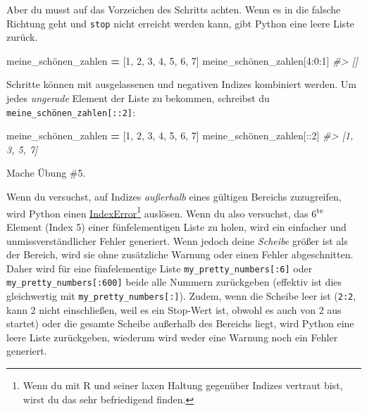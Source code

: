 \documentclass[
]{book}
\newenvironment{Shaded}{\begin{snugshade}}{\end{snugshade}}
\newcommand{\CommentTok}[1]{\textcolor[rgb]{0.56,0.35,0.01}{\textit{#1}}}
\newcommand{\DecValTok}[1]{\textcolor[rgb]{0.00,0.00,0.81}{#1}}
\newcommand{\NormalTok}[1]{#1}
\newcommand{\OperatorTok}[1]{\textcolor[rgb]{0.81,0.36,0.00}{\textbf{#1}}}
\begin{document}
Aber du musst auf das Vorzeichen des Schritts achten. Wenn es in die falsche Richtung geht und \texttt{stop} nicht erreicht werden kann, gibt Python eine leere Liste zurück.

\begin{Shaded}
\begin{Highlighting}[]
\NormalTok{meine\_schönen\_zahlen }\OperatorTok{=}\NormalTok{ [}\DecValTok{1}\NormalTok{, }\DecValTok{2}\NormalTok{, }\DecValTok{3}\NormalTok{, }\DecValTok{4}\NormalTok{, }\DecValTok{5}\NormalTok{, }\DecValTok{6}\NormalTok{, }\DecValTok{7}\NormalTok{]}
\NormalTok{meine\_schönen\_zahlen[}\DecValTok{4}\NormalTok{:}\DecValTok{0}\NormalTok{:}\DecValTok{1}\NormalTok{]}
\CommentTok{\#\textgreater{} []}
\end{Highlighting}
\end{Shaded}

Schritte können mit ausgelassenen und negativen Indizes kombiniert werden. Um jedes \emph{ungerade} Element der Liste zu bekommen, schreibst du \texttt{meine\_schönen\_zahlen{[}::2{]}}:

\begin{Shaded}
\begin{Highlighting}[]
\NormalTok{meine\_schönen\_zahlen }\OperatorTok{=}\NormalTok{ [}\DecValTok{1}\NormalTok{, }\DecValTok{2}\NormalTok{, }\DecValTok{3}\NormalTok{, }\DecValTok{4}\NormalTok{, }\DecValTok{5}\NormalTok{, }\DecValTok{6}\NormalTok{, }\DecValTok{7}\NormalTok{]}
\NormalTok{meine\_schönen\_zahlen[::}\DecValTok{2}\NormalTok{]}
\CommentTok{\#\textgreater{} [1, 3, 5, 7]}
\end{Highlighting}
\end{Shaded}

Mache Übung \#5.

Wenn du versuchst, auf Indizes \emph{außerhalb} eines gültigen Bereichs zuzugreifen, wird Python einen \href{https://docs.python.org/3/library/exceptions.html\#IndexError}{IndexError}\footnote{Wenn du mit R und seiner laxen Haltung gegenüber Indizes vertraut bist, wirst du das sehr befriedigend finden.} auslösen. Wenn du also versuchst, das 6\textsuperscript{te} Element (Index 5) einer fünfelementigen Liste zu holen, wird ein einfacher und unmissverständlicher Fehler generiert. Wenn jedoch deine \emph{Scheibe} größer ist als der Bereich, wird sie ohne zusätzliche Warnung oder einen Fehler abgeschnitten. Daher wird für eine fünfelementige Liste \texttt{my\_pretty\_numbers{[}:6{]}} oder \texttt{my\_pretty\_numbers{[}:600{]}} beide alle Nummern zurückgeben (effektiv ist dies gleichwertig mit \texttt{my\_pretty\_numbers{[}:{]}}). Zudem, wenn die Scheibe leer ist (\texttt{2:2}, kann 2 nicht einschließen, weil es ein Stop-Wert ist, obwohl es auch von 2 aus startet) oder die gesamte Scheibe außerhalb des Bereichs liegt, wird Python eine leere Liste zurückgeben, wiederum wird weder eine Warnung noch ein Fehler generiert.
\end{document}
